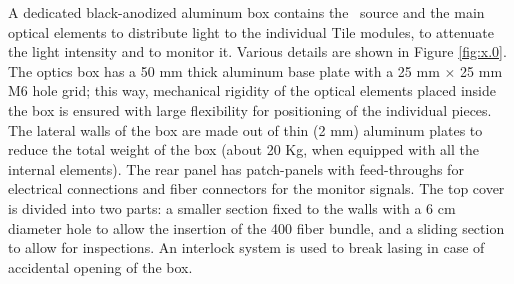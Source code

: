 A dedicated black-anodized aluminum box contains the \laser~source and the main optical
elements to distribute light to the individual Tile modules, to attenuate the light
intensity and to monitor it. Various details are shown in Figure \ref{fig:x.0}. The
optics box has a 50 mm thick aluminum base plate with a 25 mm $\times$ 25 mm M6 hole
grid; this way, mechanical rigidity of the optical elements 
placed inside the box is ensured with large flexibility for positioning of the
individual pieces. The lateral walls of the box are made out of thin (2 mm) aluminum
plates to
reduce the total weight of the box (about 20 Kg, when equipped with all the internal
elements). The rear panel has patch-panels with feed-throughs for electrical
connections and fiber connectors for the monitor signals. The top cover is divided
into two parts: a smaller section fixed to the walls with a 6 cm diameter hole to
allow the insertion of the 400 fiber bundle, and a sliding section to allow for
inspections.  An interlock system is used to break lasing in case of accidental
opening of the box. 
